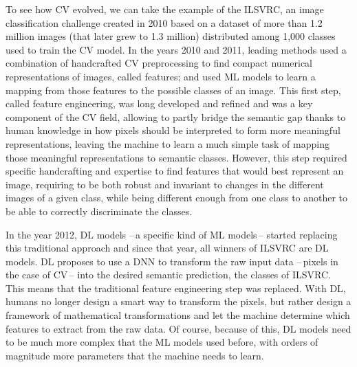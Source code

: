 To see how \ac{CV} evolved, we can take the example of the \acf{ILSVRC}, an image classification challenge created in 2010 based on a dataset of more than 1.2 million images (that later grew to 1.3 million) distributed among 1,000 classes used to train the \acf{CV} model. In the years 2010 and 2011, leading methods used a combination of handcrafted \ac{CV} preprocessing to find compact numerical representations of images, called features; and used \ac{ML} models to learn a mapping from those features to the possible classes of an image. This first step, called feature engineering, was long developed and refined and was a key component of the \ac{CV} field, allowing to partly bridge the semantic gap thanks to human knowledge in how pixels should be interpreted to form more meaningful representations, leaving the machine to learn a much simple task of mapping those meaningful representations to semantic classes. However, this step required specific handcrafting and expertise to find features that would best represent an image, requiring to be both robust and invariant to changes in the different images of a given class, while being different enough from one class to another to be able to correctly discriminate the classes.

In the year 2012, \acf{DL} models --\,a specific kind of \ac{ML} models\,-- started replacing this traditional approach and since that year, all winners of \ac{ILSVRC} are \ac{DL} models. \acf{DL} proposes to use a \acf{DNN} to transform the raw input data --\,pixels in the case of \ac{CV}\,-- into the desired semantic prediction, \eg the classes of \ac{ILSVRC}. This means that the traditional feature engineering step was replaced. With \ac{DL}, humans no longer design a smart way to transform the pixels, but rather design a framework of mathematical transformations and let the machine determine which features to extract from the raw data. Of course, because of this, \ac{DL} models need to be much more complex that the \ac{ML} models used before, with orders of magnitude more parameters that the machine needs to learn.

